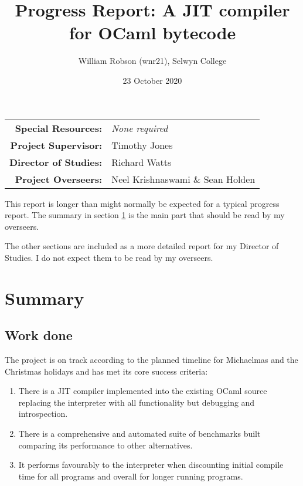 \documentclass[12pt,a4paper, headings=standardclasses, parskip=on]{scrartcl}
\begin{document}
\title{Progress Report: A JIT compiler for OCaml bytecode}
\author{William Robson (wnr21), Selwyn College}
\date{23 October 2020}

\maketitle

\begin{center}
      \begin{tabular}{rl}
            \textbf{Special Resources:}   & \textit{None required}           \\
            \textbf{Project Supervisor:}  & Timothy Jones                    \\
            \textbf{Director of Studies:} & Richard Watts                    \\
            \textbf{Project Overseers:}   & Neel Krishnaswami \& Sean Holden \\
      \end{tabular}
\end{center}

This report is longer than might normally be expected for a typical progress
report. The summary in section \ref{sum} is the main part that should be read by my
overseers.

The other sections are included as a more detailed report for my Director of
Studies. I do not expect them to be read by my overseers.

\tableofcontents

\section{Summary} \label{sum}

\subsection{Work done}

The project is on track according to the planned timeline for Michaelmas and the Christmas holidays and has
met its core success criteria:

\begin{enumerate}
      \item There is a JIT compiler implemented into the existing OCaml source
            replacing the interpreter with all functionality but debugging
            and introspection.
      \item There is a comprehensive and automated suite of benchmarks built
            comparing its performance to other alternatives.
      \item It performs favourably to the interpreter when discounting
            initial compile time for all programs and overall for longer running
            programs.
\end{enumerate}
\end{document}
